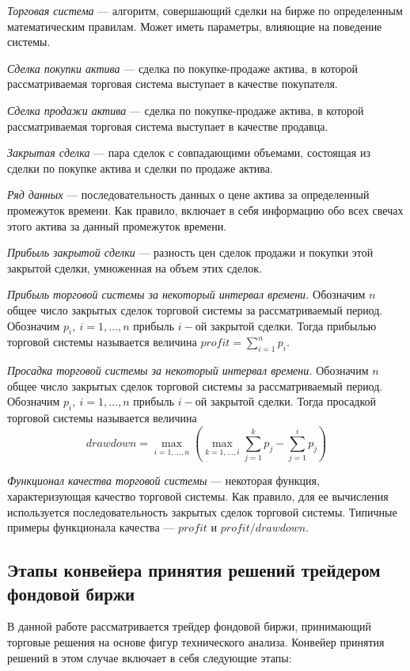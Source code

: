 \documentclass[a4paper, 14pt]{extarticle}
\numberwithin{figure}{subsection}
\numberwithin{equation}{subsection}
\begin{document}
{\it Торговая система} --- алгоритм, совершающий сделки на бирже по определенным математическим правилам. Может иметь параметры, влияющие на поведение системы.

{\it Сделка покупки актива} --- сделка по покупке-продаже актива, в которой рассматриваемая торговая система выступает в качестве покупателя.

{\it Сделка продажи актива} --- сделка по покупке-продаже актива, в которой рассматриваемая торговая система выступает в качестве продавца.

{\it Закрытая сделка} --- пара сделок с совпадающими объемами, состоящая из сделки по покупке актива и сделки по продаже актива.

{\it Ряд данных} --- последовательность данных о цене актива за определенный промежуток времени. Как правило, включает в себя информацию обо всех свечах этого актива за данный промежуток времени.

{\it Прибыль закрытой сделки} --- разность цен сделок продажи и покупки этой закрытой сделки, умноженная на объем этих сделок.

{\it Прибыль торговой системы за некоторый интервал времени.} Обозначим $n$ общее число закрытых сделок торговой системы за рассматриваемый период. Обозначим $p_i,~i=1,...,n$ прибыль $i-$ой закрытой сделки. Тогда прибылью торговой системы называется величина $profit=\sum\limits_{i=1}^n{p_i}$.

{\it Просадка торговой системы за некоторый интервал времени.} Обозначим $n$ общее число закрытых сделок торговой системы за рассматриваемый период. Обозначим $p_i,~i=1,...,n$ прибыль $i-$ой закрытой сделки. Тогда просадкой торговой системы называется величина $$drawdown=\max\limits_{i=1,...,n}\left(\max\limits_{k=1,...,i}\sum\limits_{j=1}^kp_j - \sum\limits_{j=1}^ip_j\right)$$

{\it Функционал качества торговой системы} --- некоторая функция, характеризующая качество торговой системы. Как правило, для ее вычисления используется последовательность закрытых сделок торговой системы. Типичные примеры функционала качества --- $profit$ и $profit/drawdown$.
\subsection{Этапы конвейера принятия решений трейдером фондовой биржи}
В данной работе рассматривается трейдер фондовой биржи, принимающий торговые решения на основе фигур технического анализа. Конвейер принятия решений в этом случае включает в себя следующие этапы:
\end{document}
